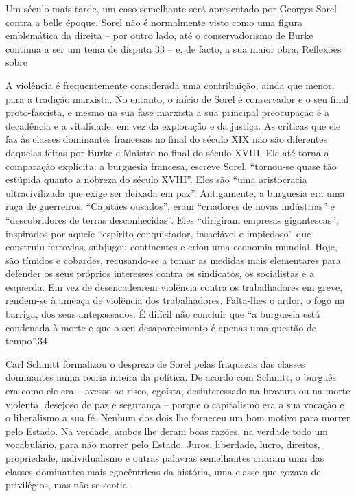  \par 
Um século mais tarde, um caso semelhante será apresentado por Georges Sorel contra a belle époque. Sorel não é normalmente visto como uma figura emblemática da direita – por outro lado, até o conservadorismo de Burke continua a ser um tema de disputa {\color{blue}33} – e, de facto, a sua maior obra, Reflexões sobre
 \par 
A violência é frequentemente considerada uma contribuição, ainda que menor, para a tradição marxista. No entanto, o início de Sorel é conservador e o seu final proto-fascista, e mesmo na sua fase marxista a sua principal preocupação é a decadência e a vitalidade, em vez da exploração e da justiça. As críticas que ele faz às classes dominantes francesas no final do século XIX não são diferentes daquelas feitas por Burke e Maistre no final do século XVIII. Ele até torna a comparação explícita: a burguesia francesa, escreve Sorel, “tornou-se quase tão estúpida quanto a nobreza do século XVIII”. Eles são “uma aristocracia ultracivilizada que exige ser deixada em paz”. Antigamente, a burguesia era uma raça de guerreiros. “Capitães ousados”, eram “criadores de novas indústrias” e “descobridores de terras desconhecidas”. Eles “dirigiram empresas gigantescas”, inspirados por aquele “espírito conquistador, insaciável e impiedoso” que construiu ferrovias, subjugou continentes e criou uma economia mundial. Hoje, são tímidos e cobardes, recusando-se a tomar as medidas mais elementares para defender os seus próprios interesses contra os sindicatos, os socialistas e a esquerda. Em vez de desencadearem violência contra os trabalhadores em greve, rendem-se à ameaça de violência dos trabalhadores. Falta-lhes o ardor, o fogo na barriga, dos seus antepassados. É difícil não concluir que “a burguesia está condenada à morte e que o seu desaparecimento é apenas uma questão de tempo”.{\color{blue}34}
 \par 
Carl Schmitt formalizou o desprezo de Sorel pelas fraquezas das classes dominantes numa teoria inteira da política. De acordo com Schmitt, o burguês era como ele era – avesso ao risco, egoísta, desinteressado na bravura ou na morte violenta, desejoso de paz e segurança – porque o capitalismo era a sua vocação e o liberalismo a sua fé. Nenhum dos dois lhe forneceu um bom motivo para morrer pelo Estado. Na verdade, ambos lhe deram boas razões, na verdade todo um vocabulário, para não morrer pelo Estado. Juros, liberdade, lucro, direitos, propriedade, individualismo e outras palavras semelhantes criaram uma das classes dominantes mais egocêntricas da história, uma classe que gozava de privilégios, mas não se sentia
